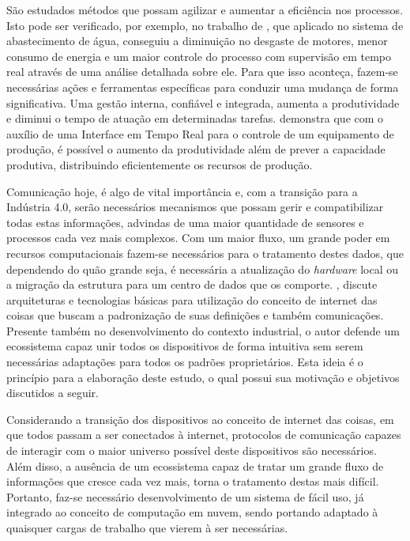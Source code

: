 São estudados métodos que possam agilizar e aumentar a eficiência nos processos. Isto pode ser verificado, por exemplo, no trabalho de , que aplicado no sistema de abastecimento de água, conseguiu a diminuição no desgaste de motores, menor consumo de energia e um maior controle do processo com supervisão em tempo real através de uma análise detalhada sobre ele. Para que isso aconteça, fazem-se necessárias ações e ferramentas específicas para conduzir uma mudança de forma significativa.
Uma gestão interna, confiável e integrada, aumenta a produtividade e diminui o tempo de atuação em  determinadas tarefas.   demonstra que com o auxílio de uma Interface em Tempo Real para o controle de um equipamento de produção, é possível o aumento da produtividade além de prever a capacidade produtiva, distribuindo eficientemente os recursos de produção.

Comunicação hoje, é algo de vital importância e, com a transição para a Indústria 4.0, serão necessários mecanismos que possam gerir e compatibilizar todas estas informações, advindas de uma maior quantidade de sensores e processos cada vez mais complexos. Com um maior fluxo, um grande poder em recursos computacionais fazem-se necessários para o tratamento destes dados, que dependendo do quão grande seja, é necessária a atualização do \textit{hardware} local ou a migração da estrutura para um centro de dados que os comporte. , discute arquiteturas e tecnologias básicas para utilização do conceito de internet das coisas que buscam a padronização de suas definições e também comunicações. Presente também no desenvolvimento do contexto industrial, o autor defende um ecossistema capaz unir todos os dispositivos de forma intuitiva sem serem necessárias adaptações para todos os padrões proprietários. Esta ideia é o princípio para a elaboração
deste estudo, o qual possui sua motivação e objetivos discutidos a seguir.

Considerando a transição dos dispositivos ao conceito de internet das coisas, em que todos passam a ser conectados à internet, protocolos de comunicação capazes de interagir com o maior universo possível deste dispositivos são necessários. Além disso, a ausência de um ecossistema capaz de tratar um grande fluxo de informações que cresce cada vez mais, torna o tratamento destas mais difícil. Portanto, faz-se necessário desenvolvimento de um sistema de fácil uso, já integrado ao conceito de computação em nuvem, sendo portando adaptado à quaisquer cargas de trabalho que vierem à ser necessárias.

